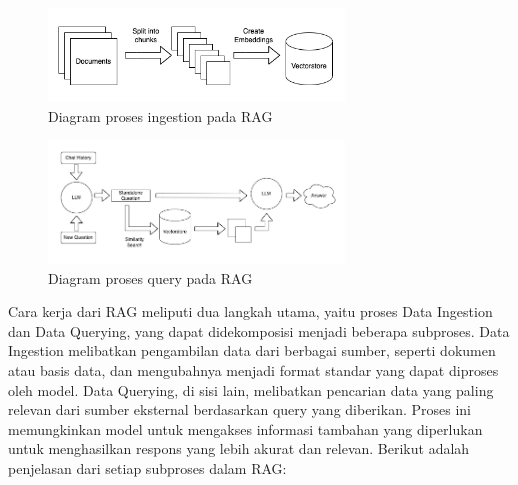 \begin{figure}[ht]
  \centering
  \includegraphics[width=0.7\textwidth]{resources/chapter-2/rag-ingestion.png}
  \caption{Diagram proses ingestion pada RAG \parencite{langchain_chatgpt_data}}
  \label{image:rag-ingestion}
  \end{figure}

\begin{figure}[ht]
  \centering
  \includegraphics[width=0.7\textwidth]{resources/chapter-2/rag-query.png}
  \caption{Diagram proses query pada RAG \parencite{langchain_chatgpt_data}}
  \label{image:rag-query}
\end{figure}

Cara kerja dari RAG meliputi dua langkah utama, yaitu proses Data Ingestion dan Data Querying, yang dapat didekomposisi menjadi beberapa subproses. Data Ingestion melibatkan pengambilan data dari berbagai sumber, seperti dokumen atau basis data, dan mengubahnya menjadi format standar yang dapat diproses oleh model. Data Querying, di sisi lain, melibatkan pencarian data yang paling relevan dari sumber eksternal berdasarkan query yang diberikan. Proses ini memungkinkan model untuk mengakses informasi tambahan yang diperlukan untuk menghasilkan respons yang lebih akurat dan relevan. Berikut adalah penjelasan dari setiap subproses dalam RAG:

